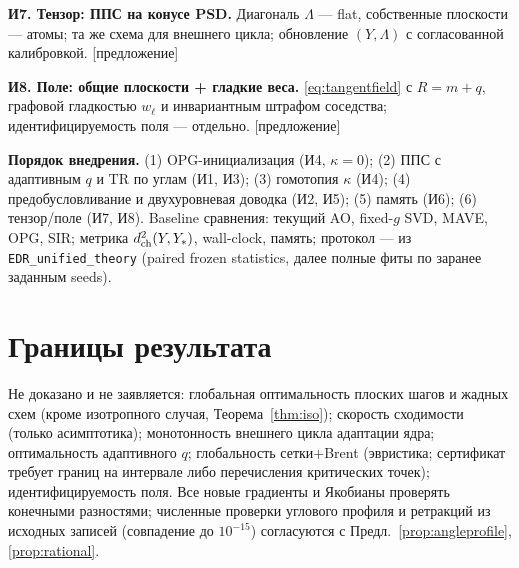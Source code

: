 \documentclass[11pt,a4paper]{article}
\theoremstyle{remark}
\begin{document}
\textbf{И7. Тензор: ППС на конусе PSD.} Диагональ $\Lambda$ --- flat,
собственные плоскости --- атомы; та же схема для внешнего цикла; обновление
 $(Y,\Lambda)$ с согласованной калибровкой. [предложение]

\textbf{И8. Поле: общие плоскости + гладкие веса.} \eqref{eq:tangentfield}
с $R=m+q$, графовой гладкостью $w_\ell$ и инвариантным штрафом соседства;
идентифицируемость поля --- отдельно. [предложение]

\medskip
\textbf{Порядок внедрения.} (1) OPG-инициализация (И4, $\kappa=0$);
(2) ППС с адаптивным $q$ и TR по углам (И1, И3); (3) гомотопия $\kappa$ (И4); (4) предобусловливание и двухуровневая доводка (И2, И5); (5) память
(И6); (6) тензор/поле (И7, И8). Baseline сравнения: текущий AO, fixed-$g$ SVD, MAVE, OPG, SIR; метрика $d_{\rm ch}^2(Y,Y_*)$, wall-clock, память;
протокол --- из \texttt{EDR\_unified\_theory} (paired frozen statistics,
далее полные фиты по заранее заданным seeds).

\section{Границы результата}\label{sec:limits}

Не доказано и не заявляется: глобальная оптимальность плоских шагов и
жадных схем (кроме изотропного случая, Теорема~\ref{thm:iso}); скорость
сходимости (только асимптотика); монотонность внешнего цикла адаптации
ядра; оптимальность адаптивного $q$; глобальность сетки+Brent
(эвристика; сертификат требует границ на интервале либо перечисления
критических точек); идентифицируемость поля. Все новые градиенты и
Якобианы проверять конечными разностями; численные проверки углового
профиля и ретракций из исходных записей (совпадение до $10^{-15}$)
согласуются с Предл.~\ref{prop:angleprofile}, \ref{prop:rational}.

\appendix
\end{document}
